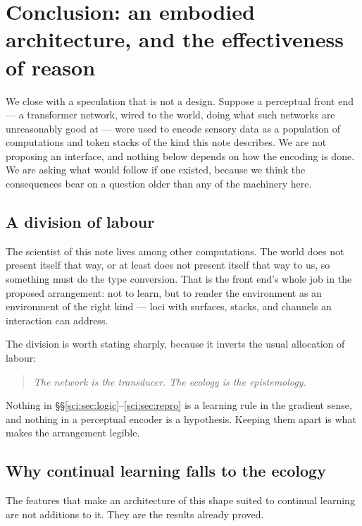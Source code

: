 \section{Conclusion: an embodied architecture, and the effectiveness of reason}\label{sci:S17}
\label{sci:sec:conclusion}

We close with a speculation that is not a design. Suppose a perceptual front end --- a transformer
network, wired to the world, doing what such networks are unreasonably good at --- were used to encode
sensory data as a population of computations and token stacks of the kind this note describes. We are
not proposing an interface, and nothing below depends on how the encoding is done. We are asking what
would follow if one existed, because we think the consequences bear on a question older than any of
the machinery here.

\subsection{A division of labour}\label{sci:S17.1}

The scientist of this note lives among other computations. The world does not present itself that way,
or at least does not present itself that way to us, so something must do the type conversion. That is
the front end's whole job in the proposed arrangement: not to learn, but to render the environment as
an environment of the right kind --- loci with surfaces, stacks, and channels an interaction can
address.

The division is worth stating sharply, because it inverts the usual allocation of labour:

\begin{quote}
\itshape The network is the transducer. The ecology is the epistemology.
\end{quote}

Nothing in \S\S\ref{sci:sec:logic}--\ref{sci:sec:repro} is a learning rule in the gradient sense, and nothing
in a perceptual encoder is a hypothesis. Keeping them apart is what makes the arrangement legible.

\subsection{Why continual learning falls to the ecology}\label{sci:S17.2}

The features that make an architecture of this shape suited to continual learning are not additions to
it. They are the results already proved.

